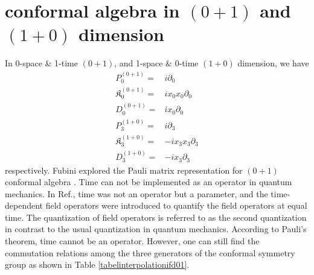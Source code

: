 \documentclass[%
 reprint,
superscriptaddress,
 amsmath,amssymb,
 aps,
]{revtex4-2}
\begin{document}
\section{conformal algebra in \texorpdfstring{$(0+1)$}
{Lg} and \texorpdfstring{$(1+0)$}{Lg} dimension}
\label{sec:conformal0110}

 In 0-space \& 1-time $(0+1)$, and 1-space \& 0-time $(1+0)$ dimension, we have
\begin{align}
    P^{(0+1)}_{0}=&i\partial_{0}\\
    \mathfrak{K}^{(0+1)}_{{0}}=&ix_{0}x_{0}\partial_{{0}}\\
    D^{(0+1)}_{0}=&ix_{0}\partial_{0}\\
    P^{(1+0)}_{3}=&i\partial_{3}\\
    \mathfrak{K}^{(1+0)}_{{3}}=&-ix_{3}x_{3}\partial_{{3}}\\
    D^{(1+0)}_{3}=&-ix_{3}\partial_{3}\label{0110xpartial}
\end{align}
respectively. Fubini explored the Pauli matrix representation for $(0+1)$ conformal algebra \cite{Fubini1976}. Time can not be implemented as an operator in quantum mechanics. In Ref.\cite{Fubini1976}, time was not an operator but a parameter, and the time-dependent field operators were introduced to quantify the field operators at equal time. The quantization of field operators is referred to as the second quantization in contrast to the usual quantization in quantum mechanics. According to Pauli's theorem\cite{Galapon1999}, time cannot be an operator. However, one can still find the commutation relations among the three generators of the conformal symmetry group as shown in Table \ref{tabelinterpolationifd01}. 

\begin{table}[h!]
\centering
\caption{\label{tabelinterpolationifd01}$0+1$ conformal algebra in IFD}
\end{table}
\end{document}
